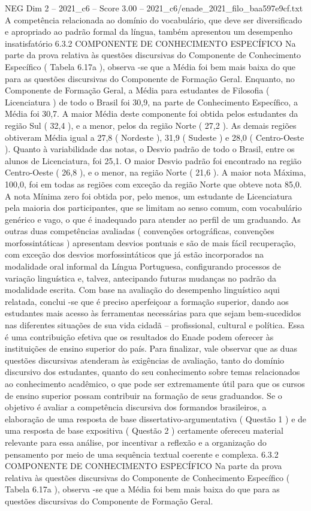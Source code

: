 \begin{textsample}{NEG Dim 2 – 2021\_c6 – Score 3.00 – 2021\_c6/enade\_2021\_filo\_baa597e9cf.txt}
A competência relacionada ao domínio do vocabulário, que deve ser diversificado e apropriado ao padrão formal da língua, também apresentou um desempenho insatisfatório 6.3.2 COMPONENTE DE CONHECIMENTO ESPECÍFICO Na parte da prova relativa às questões discursivas do Componente de Conhecimento Específico ( Tabela 6.17a ), observa -se que a Média foi bem mais baixa do que para as questões discursivas do Componente de Formação Geral.
Enquanto, no Componente de Formação Geral, a Média para estudantes de Filosofia ( Licenciatura ) de todo o Brasil foi 30,9, na parte de Conhecimento Específico, a Média foi 30,7.
A maior Média deste componente foi obtida pelos estudantes da região Sul ( 32,4 ), e a menor, pelos da região Norte ( 27,2 ).
As demais regiões obtiveram Média igual a 27,8 ( Nordeste ), 31,9 ( Sudeste ) e 28,0 ( Centro-Oeste ).
Quanto à variabilidade das notas, o Desvio padrão de todo o Brasil, entre os alunos de Licenciatura, foi 25,1.
O maior Desvio padrão foi encontrado na região Centro-Oeste ( 26,8 ), e o menor, na região Norte ( 21,6 ).
A maior nota Máxima, 100,0, foi em todas as regiões com exceção da região Norte que obteve nota 85,0.
A nota Mínima zero foi obtida por, pelo menos, um estudante de Licenciatura pela maioria dos participantes, que se limitam ao senso comum, com vocabulário genérico e vago, o que é inadequado para atender ao perfil de um graduando.
As outras duas competências avaliadas ( convenções ortográficas, convenções morfossintáticas ) apresentam desvios pontuais e são de mais fácil recuperação, com exceção dos desvios morfossintáticos que já estão incorporados na modalidade oral informal da Língua Portuguesa, configurando processos de variação linguística e, talvez, antecipando futuras mudanças no padrão da modalidade escrita.
Com base na avaliação do desempenho linguístico aqui relatada, conclui -se que é preciso aperfeiçoar a formação superior, dando aos estudantes mais acesso às ferramentas necessárias para que sejam bem-sucedidos nas diferentes situações de sua vida cidadã – profissional, cultural e política.
Essa é uma contribuição efetiva que os resultados do Enade podem oferecer às instituições de ensino superior do país.
Para finalizar, vale observar que as duas questões discursivas atenderam às exigências de avaliação, tanto do domínio discursivo dos estudantes, quanto do seu conhecimento sobre temas relacionados ao conhecimento acadêmico, o que pode ser extremamente útil para que os cursos de ensino superior possam contribuir na formação de seus graduandos.
Se o objetivo é avaliar a competência discursiva dos formandos brasileiros, a elaboração de uma resposta de base dissertativo-argumentativa ( Questão 1 ) e de uma resposta de base expositiva ( Questão 2 ) certamente ofereceu material relevante para essa análise, por incentivar a reflexão e a organização do pensamento por meio de uma sequência textual coerente e complexa. 6.3.2 COMPONENTE DE CONHECIMENTO ESPECÍFICO Na parte da prova relativa às questões discursivas do Componente de Conhecimento Específico ( Tabela 6.17a ), observa -se que a Média foi bem mais baixa do que para as questões discursivas do Componente de Formação Geral.

\end{textsample}
